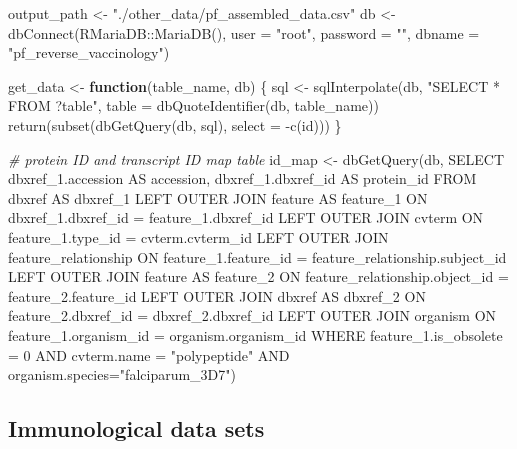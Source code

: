 \documentclass[
  11pt,
  oneside]{book}
\newenvironment{Shaded}{\begin{snugshade}}{\end{snugshade}}
\newcommand{\AttributeTok}[1]{\textcolor[rgb]{0.77,0.63,0.00}{#1}}
\newcommand{\CommentTok}[1]{\textcolor[rgb]{0.56,0.35,0.01}{\textit{#1}}}
\newcommand{\ControlFlowTok}[1]{\textcolor[rgb]{0.13,0.29,0.53}{\textbf{#1}}}
\newcommand{\FunctionTok}[1]{\textcolor[rgb]{0.00,0.00,0.00}{#1}}
\newcommand{\NormalTok}[1]{#1}
\newcommand{\OtherTok}[1]{\textcolor[rgb]{0.56,0.35,0.01}{#1}}
\newcommand{\SpecialCharTok}[1]{\textcolor[rgb]{0.00,0.00,0.00}{#1}}
\newcommand{\StringTok}[1]{\textcolor[rgb]{0.31,0.60,0.02}{#1}}
\begin{document}
\begin{Shaded}
\begin{Highlighting}[]
\NormalTok{output\_path }\OtherTok{\textless{}{-}} \StringTok{"./other\_data/pf\_assembled\_data.csv"}
\NormalTok{db }\OtherTok{\textless{}{-}} \FunctionTok{dbConnect}\NormalTok{(RMariaDB}\SpecialCharTok{::}\FunctionTok{MariaDB}\NormalTok{(), }\AttributeTok{user =} \StringTok{"root"}\NormalTok{, }\AttributeTok{password =} \StringTok{""}\NormalTok{, }\AttributeTok{dbname =} \StringTok{"pf\_reverse\_vaccinology"}\NormalTok{)}

\NormalTok{get\_data }\OtherTok{\textless{}{-}} \ControlFlowTok{function}\NormalTok{(table\_name, db) \{}
\NormalTok{  sql }\OtherTok{\textless{}{-}} \FunctionTok{sqlInterpolate}\NormalTok{(db, }\StringTok{"SELECT * FROM ?table"}\NormalTok{, }\AttributeTok{table =} \FunctionTok{dbQuoteIdentifier}\NormalTok{(db, table\_name))}
  \FunctionTok{return}\NormalTok{(}\FunctionTok{subset}\NormalTok{(}\FunctionTok{dbGetQuery}\NormalTok{(db, sql), }\AttributeTok{select =} \SpecialCharTok{{-}}\FunctionTok{c}\NormalTok{(id)))}
\NormalTok{\}}

\CommentTok{\# protein ID and transcript ID map table}
\NormalTok{id\_map }\OtherTok{\textless{}{-}} \FunctionTok{dbGetQuery}\NormalTok{(db, }\StringTok{\textquotesingle{}SELECT dbxref\_1.accession AS accession, dbxref\_1.dbxref\_id AS protein\_id FROM dbxref AS dbxref\_1}
\StringTok{                         LEFT OUTER JOIN feature AS feature\_1 ON dbxref\_1.dbxref\_id = feature\_1.dbxref\_id}
\StringTok{                         LEFT OUTER JOIN cvterm ON feature\_1.type\_id = cvterm.cvterm\_id}
\StringTok{                         LEFT OUTER JOIN feature\_relationship ON feature\_1.feature\_id = feature\_relationship.subject\_id}
\StringTok{                         LEFT OUTER JOIN feature AS feature\_2 ON feature\_relationship.object\_id = feature\_2.feature\_id}
\StringTok{                         LEFT OUTER JOIN dbxref AS dbxref\_2 ON feature\_2.dbxref\_id = dbxref\_2.dbxref\_id}
\StringTok{                         LEFT OUTER JOIN organism ON feature\_1.organism\_id = organism.organism\_id}
\StringTok{                         WHERE feature\_1.is\_obsolete = 0 AND cvterm.name = "polypeptide" AND organism.species="falciparum\_3D7"\textquotesingle{}}\NormalTok{)}
\end{Highlighting}
\end{Shaded}

\hypertarget{immunological-data-sets}{%
\subsection{Immunological data sets}\label{immunological-data-sets}}
\end{document}
